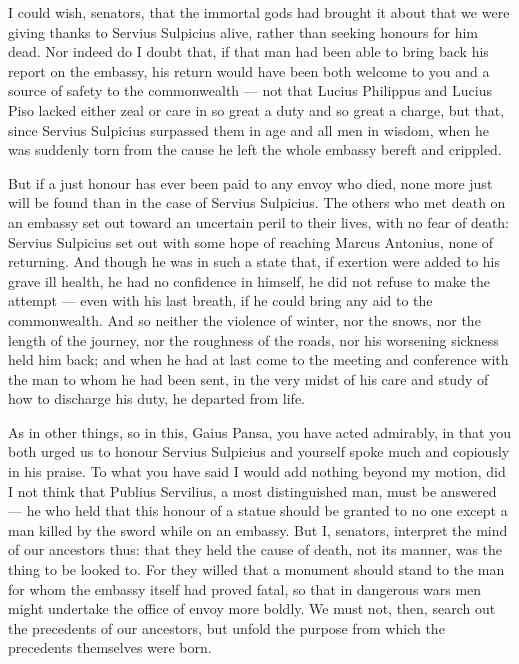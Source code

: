 
 I could wish, senators, that the immortal gods had brought it about that we were giving thanks to Servius Sulpicius alive, rather than seeking honours for him dead. Nor indeed do I doubt that, if that man had been able to bring back his report on the embassy, his return would have been both welcome to you and a source of safety to the commonwealth --- not that Lucius Philippus and Lucius Piso lacked either zeal or care in so great a duty and so great a charge, but that, since Servius Sulpicius surpassed them in age and all men in wisdom, when he was suddenly torn from the cause he left the whole embassy bereft and crippled.

 But if a just honour has ever been paid to any envoy who died, none more just will be found than in the case of Servius Sulpicius. The others who met death on an embassy set out toward an uncertain peril to their lives, with no fear of death: Servius Sulpicius set out with some hope of reaching Marcus Antonius, none of returning. And though he was in such a state that, if exertion were added to his grave ill health, he had no confidence in himself, he did not refuse to make the attempt --- even with his last breath, if he could bring any aid to the commonwealth. And so neither the violence of winter, nor the snows, nor the length of the journey, nor the roughness of the roads, nor his worsening sickness held him back; and when he had at last come to the meeting and conference with the man to whom he had been sent, in the very midst of his care and study of how to discharge his duty, he departed from life.

 As in other things, so in this, Gaius Pansa, you have acted admirably, in that you both urged us to honour Servius Sulpicius and yourself spoke much and copiously in his praise. To what you have said I would add nothing beyond my motion, did I not think that Publius Servilius, a most distinguished man, must be answered --- he who held that this honour of a statue should be granted to no one except a man killed by the sword while on an embassy. But I, senators, interpret the mind of our ancestors thus: that they held the cause of death, not its manner, was the thing to be looked to. For they willed that a monument should stand to the man for whom the embassy itself had proved fatal, so that in dangerous wars men might undertake the office of envoy more boldly. We must not, then, search out the precedents of our ancestors, but unfold the purpose from which the precedents themselves were born.

